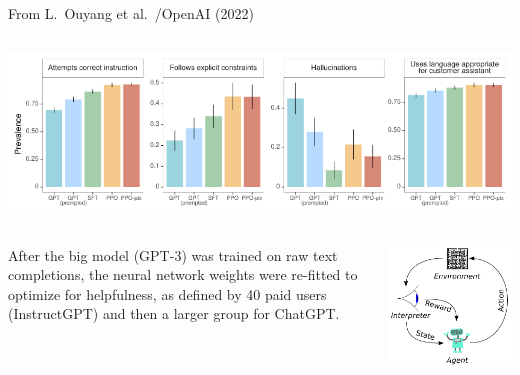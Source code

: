 \documentclass[aspectratio=169]{beamer}
\begin{document}
\begin{frame}{From L.\ Ouyang et al.\ /OpenAI (2022)}
\large
\vspace{0.4 cm}
\begin{columns}
\includegraphics[width=\linewidth]{fine-tuning-for-chat-results.pdf}
\end{columns}

\vspace{0.2 cm}
\begin{columns}
After the big model (GPT-3) was trained on raw text completions, the neural network weights were re-fitted to optimize for helpfulness, as defined by 40 paid users (InstructGPT) and then a larger group for ChatGPT.

\includegraphics[width=\linewidth]{Reinforcement_learning_diagram.pdf}
\end{columns}
\end{frame}
\end{document}

